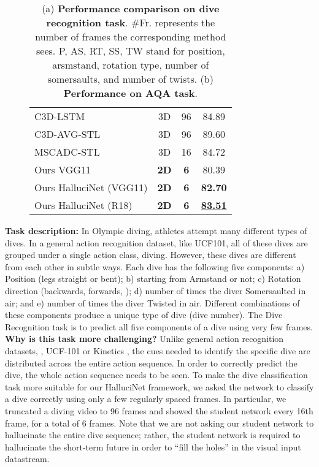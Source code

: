 \documentclass[10pt,twocolumn,letterpaper]{article}
\begin{document}
{\begin{table*}
\begin{subfigure}[]{0.4\textwidth}
\begin{tabular}{lccc}
C3D-LSTM \cite{ltsoe}           & 3D & 96              & 84.89              \\
C3D-AVG-STL \cite{mtlaqa}        & 3D & 96              & 89.60              \\
MSCADC-STL \cite{mtlaqa}        & 3D & 16              & 84.72              \\ \midrule
Ours VGG11        & \textbf{2D} & \textbf{6}               & 80.39                  \\
Ours HalluciNet (\footnotesize{VGG11}) & \textbf{2D} & \textbf{6}               & \textbf{82.70}                  \\ 
Ours HalluciNet (R18) & \textbf{2D} & \textbf{6}               & \underline{\textbf{83.51}}                  \\ \bottomrule
\end{tabular}
\caption{}
\label{tab_res_aqa}
\end{subfigure}
\caption{(a) \textbf{Performance comparison on dive recognition task}. \#Fr. represents the number of frames the corresponding method sees. P, AS, RT, SS, TW stand for position, arsmstand, rotation type, number of somersaults, and number of twists. (b) \textbf{Performance on AQA task}.}
\end{table*}} \noindent\textbf{Task description:} In Olympic diving, athletes attempt many different types of dives. In a general action recognition dataset, like UCF101, all of these dives are grouped under a single action class, diving. However, these dives are different from each other in subtle ways. Each dive has the following five components: a) Position (legs straight or bent); b) starting from Armstand or not; c) Rotation direction (backwards, forwards, \etc); d) number of times the diver Somersaulted in air; and e) number of times the diver Twisted in air. Different combinations of these components produce a unique type of dive (dive number). The Dive Recognition task is to predict all five components of a dive using very few frames. \\

\noindent\textbf{Why is this task more challenging?} Unlike general action recognition datasets, \eg, UCF-101 or Kinetics \cite{kinetics}, the cues needed to identify the specific dive are distributed across the entire action sequence. In order to correctly predict the dive, the whole action sequence needs to be seen. To make the dive classification task more suitable for our HalluciNet framework, we asked the network to classify a dive correctly using only a few regularly spaced frames. In particular, we truncated a diving video to 96 frames and showed the student network every 16th frame, for a total of 6 frames.  Note that we are not asking our student network to hallucinate the entire dive sequence; rather, the student network is required to hallucinate the short-term future in order to ``fill the holes'' in the visual input datastream. \\
\end{document}

